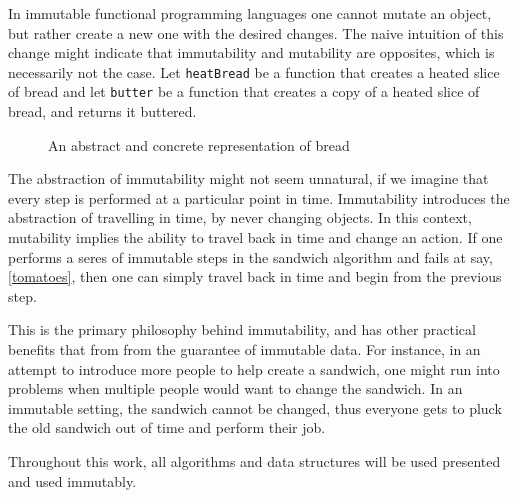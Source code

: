 In immutable functional programming languages one cannot mutate an object, but rather create a new one with the desired changes.
The naive intuition of this change might indicate that immutability and mutability are opposites, which is necessarily not the case.
Let \texttt{heatBread} be a function that creates a heated slice of bread and let \texttt{butter} be a function that creates a copy of a heated slice of bread, and returns it buttered.
\begin{figure}
\centering 
  \caption{An abstract and concrete representation of bread}
\end{figure}
The abstraction of immutability might not seem unnatural, if we imagine that every step is performed at a particular point in time.
Immutability introduces the abstraction of travelling in time, by never changing objects.
In this context, mutability implies the ability to travel back in time and change an action.
If one performs a seres of immutable steps in the sandwich algorithm and fails at say, \autoref{tomatoes}, then one can simply travel back in time and begin from the previous step.

This is the primary philosophy behind immutability, and has other practical benefits that from from the guarantee of immutable data.
For instance, in an attempt to introduce more people to help create a sandwich, one might run into problems when multiple people would want to change the sandwich.
In an immutable setting, the sandwich cannot be changed, thus everyone gets to pluck the old sandwich out of time and perform their job.

Throughout this work, all algorithms and data structures will be used presented and used immutably.

